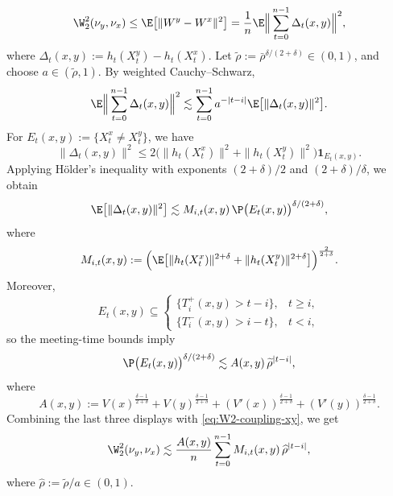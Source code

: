 \documentclass[mnsc,nonblindrev]{informs3}
\begin{document}
\begin{equation}\label{eq:W2-coupling-xy}
  \W_2^2(\nu_y,\nu_x)
  \le
  \E\bigl[\|W^y-W^x\|^2\bigr]
  =
  \frac1n\E\Big\|
    \sum_{t=0}^{n-1}\Delta_t(x,y)
  \Big\|^2,
\end{equation}
where $\Delta_t(x,y):=h_t(X_t^y)-h_t(X_t^x).$ Let \(\widetilde\rho:=\bar\rho^{\delta/(2+\delta)}\in(0,1)\), and choose
\(a\in(\widetilde\rho,1)\). By weighted Cauchy--Schwarz,
\[
  \E\Big\|
    \sum_{t=0}^{n-1}\Delta_t(x,y)
  \Big\|^2
  \lesssim
  \sum_{t=0}^{n-1}a^{-|t-i|}\E\bigl[\|\Delta_t(x,y)\|^2\bigr].
\]
For \(E_t(x,y):=\{X_t^x\neq X_t^y\}\), we have
\[
  \|\Delta_t(x,y)\|^2
  \le
  2\bigl(\|h_t(X_t^x)\|^2+\|h_t(X_t^y)\|^2\bigr)\mathbf 1_{E_t(x,y)}.
\]
Applying H\"older's inequality with exponents
\((2+\delta)/2\) and \((2+\delta)/\delta\), we obtain
\[
  \E\bigl[\|\Delta_t(x,y)\|^2\bigr]
  \lesssim
  M_{i,t}(x,y)\,
  \P\bigl(E_t(x,y)\bigr)^{\delta/(2+\delta)},
\]
where
\[
  M_{i,t}(x,y)
  :=
  \Big(
    \E\big[
      \|h_t(X_t^x)\|^{2+\delta}
      +
      \|h_t(X_t^y)\|^{2+\delta}
    \big]
  \Big)^{\frac{2}{2+\delta}}.
\]
Moreover,
\[
  E_t(x,y)\subseteq
  \begin{cases}
    \{T_i^+(x,y)>t-i\}, & t\ge i,\\[2mm]
    \{T_i^-(x,y)>i-t\}, & t<i,
  \end{cases}
\]
so the meeting-time bounds imply
\[
  \P\bigl(E_t(x,y)\bigr)^{\delta/(2+\delta)}
  \lesssim
  A(x,y)\,\widetilde\rho^{|t-i|},
\]
where
\[
  A(x,y):=
  V(x)^{\frac{\delta-1}{2+\delta}}
  +V(y)^{\frac{\delta-1}{2+\delta}}
  +(V'(x))^{\frac{\delta-1}{2+\delta}}
  +(V'(y))^{\frac{\delta-1}{2+\delta}}.
\]
Combining the last three displays with \eqref{eq:W2-coupling-xy}, we get
\begin{equation}\label{eq:W2-final-xy}
  \W_2^2(\nu_y,\nu_x)
  \lesssim
  \frac{A(x,y)}{n}
  \sum_{t=0}^{n-1}
    M_{i,t}(x,y)\,
    \widehat\rho^{|t-i|},
\end{equation}
where \(\widehat\rho:=\widetilde\rho/a\in(0,1)\).
\end{document}
